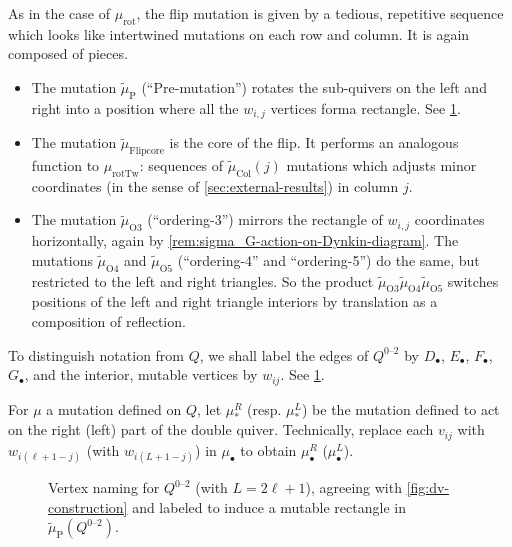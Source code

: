 \documentclass{amsart}
\theoremstyle{plain}
\theoremstyle{definition}
\theoremstyle{remark}
\newcommand{\Qdv}{Q^{0\text{--}2}}
\newcommand{\murot}{{\mu_{\text{rot}}}}
\newcommand{\murottwist}{{\mu_{\text{rotTw}}}}
\newcommand{\muint}[1]{\widetilde{\mu}_{\text{#1}}}
\newcommand{\muflipcore}{\muint{Flipcore}}
\newcommand{\mucol}{\muint{Col}}
\newcommand{\muP}{\muint{P}}
\begin{document}
  As in the case of $\murot$, the flip mutation is given by a tedious,
  repetitive sequence which looks like intertwined mutations on each row
  and column. It is again composed of pieces.
  \begin{itemize}
  \item
    The mutation $\muint{P}$ (``Pre-mutation'') rotates the sub-quivers
    on the left and right into a position where all the $w_{i,j}$
    vertices forma rectangle. See \cref{fig:Qdv-naming}.
  \item
    The mutation $\muflipcore$ is the core of the flip. It performs an
    analogous function to $\murottwist$: sequences of $\mucol(j)$
    mutations which adjusts minor coordinates (in the sense of
    \cref{sec:external-results}) in column $j$.
  \item
    The mutation $\muint{O3}$ (``ordering-3'') mirrors the rectangle of
    $w_{i,j}$ coordinates horizontally, again by
    \cref{rem:sigma_G-action-on-Dynkin-diagram}. The mutations
    $\muint{O4}$ and $\muint{O5}$ (``ordering-4'' and ``ordering-5'') do
    the same, but restricted to the left and right triangles. So the
    product $\muint{O3} \muint{O4} \muint{O5}$ switches positions of the
    left and right triangle interiors by translation as a composition of
    reflection.
  \end{itemize}

  To distinguish notation from $Q$, we shall label the edges of $\Qdv$
  by $D_{\bullet}$, $E_{\bullet}$, $F_{\bullet}$, $G_{\bullet}$, and the
  interior, mutable vertices by $w_{ij}$. See \cref{fig:Qdv-naming}.

  For $\mu$ a mutation defined on $Q$, let $\mu^R_{\ast}$ (resp.
  $\mu^L_{\ast}$) be the mutation defined to act on the right (left)
  part of the double quiver. Technically, replace each $v_{ij}$ with
  $w_{i(\ell + 1 - j)}$ (with $w_{i(L + 1 - j)}$) in $\mu_{\bullet}$ to
  obtain $\mu^{R}_{\bullet}$ ($\mu^{L}_{\bullet}$).

  \begin{figure}
    \centering 

    \caption{Vertex naming for $\Qdv$ (with $L = 2\ell + 1$), agreeing
      with \cref{fig:dv-construction} and labeled to induce a mutable
      rectangle in $\muP(\Qdv)$.
      \label{fig:Qdv-naming}
    }
  \end{figure}
\end{document}
